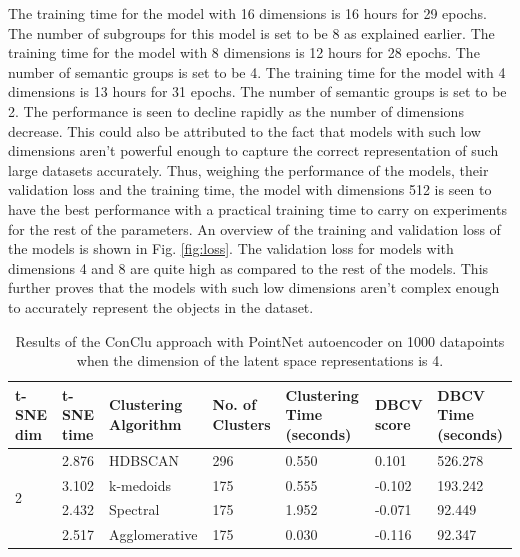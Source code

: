 The training time for the model with 16 dimensions is 16 hours for 29 epochs. The number of subgroups for this model is set to be 8 as explained earlier. The training time for the model with 8 dimensions is 12 hours for 28 epochs. The number of semantic groups is set to be 4. The training time for the model with 4 dimensions is 13 hours for 31 epochs. The number of semantic groups is set to be 2. The performance is seen to decline rapidly as the number of dimensions decrease. This could also be attributed to the fact that models with such low dimensions aren't powerful enough to capture the correct representation of such large datasets accurately. Thus, weighing the performance of the models, their validation loss and the training time, the model with dimensions 512 is seen to have the best performance with a practical training time to carry on experiments for the rest of the parameters. An overview of the training and validation loss of the models is shown in Fig. \ref{fig:loss}. The validation loss for models with dimensions 4 and 8 are quite high as compared to the rest of the models. This further proves that the models with such low dimensions aren't complex enough to accurately represent the objects in the dataset. 

\begin{table}[H]
  \setlength\extrarowheight{10pt}
  \caption{Results of the ConClu approach with PointNet autoencoder on 1000 datapoints when the dimension of the latent space representations is 4. }
  \centering
  \begin{tabular}{|p{30pt}|p{50pt}|p{60pt}|p{50pt}|p{50pt}|p{50pt}|p{40pt}|}
    \toprule
    \ac{t-SNE} dim	& \ac{t-SNE} time & Clustering Algorithm & No. of Clusters & Clustering Time (seconds) & \ac{DBCV} score & \ac{DBCV} Time (seconds)\\
    \midrule
    \multirow{4}{30pt}{2}	& 2.876 & \ac{HDBSCAN}	& 296	& 0.550 & 0.101	& 526.278 \\ \cline{2-7} 
    & 3.102 & k-medoids	& 175	& 0.555 & -0.102	& 193.242 \\ \cline{2-7} 
    & 2.432 & Spectral	& 175	& 1.952	& -0.071	& 92.449 \\ \cline{2-7}
    & 2.517 & Agglomerative	& 175	& 0.030 & -0.116 	& 92.347 \\ 
    \bottomrule
  \end{tabular}
  \label{tab:conclu_4}
\end{table}

